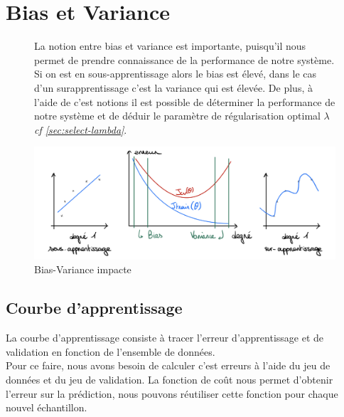 \section{Bias et Variance}

\begin{figure}[!h]
    \begin{minipage}{.40\linewidth}
        La notion entre bias et variance est importante, puisqu'il nous permet de prendre connaissance de la performance de notre système. Si on est en sous-apprentissage alors le bias est élevé, dans le cas d'un surapprentissage c'est la variance qui est élevée. De plus, à l'aide de c'est
        notions il est possible de déterminer la performance de notre système et de déduir le paramètre de régularisation optimal $\lambda$ \textit{cf \ref{sec:select-lambda}}.
    \end{minipage}\hfill
    \begin{minipage}{.56\linewidth}
        \begin{center}
            \includegraphics[width=1\textwidth]{./img/4.jpeg}
            \caption{\label{fig:bias-variance}Bias-Variance impacte}  
        \end{center}
    \end{minipage}
\end{figure}


\subsection{Courbe d'apprentissage}


La courbe d'apprentissage consiste à tracer l'erreur d'apprentissage et de validation en fonction de l'ensemble de données. \\
Pour ce faire, nous avons besoin de calculer c'est erreurs à l'aide du jeu de données et du jeu de validation. La fonction de coût nous permet d'obtenir l'erreur sur la prédiction, nous pouvons réutiliser cette fonction pour chaque nouvel échantillon.

